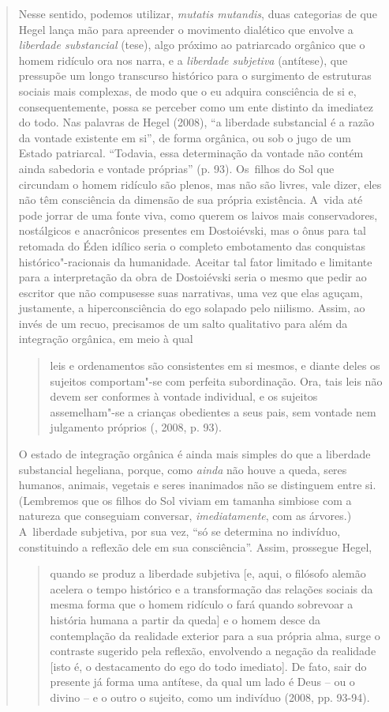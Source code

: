 {\begin{quote}
Nesse sentido, podemos utilizar, \emph{mutatis mutandis}, duas
categorias de que Hegel lança mão para apreender o movimento dialético
que envolve a \emph{liberdade substancial} (tese), algo próximo ao
patriarcado orgânico que o homem ridículo ora nos narra, e a
\emph{liberdade subjetiva} (antítese), que pressupõe um longo transcurso
histórico para o surgimento de estruturas sociais mais complexas, de
modo que o eu adquira consciência de si e, consequentemente, possa se
perceber como um ente distinto da imediatez do todo. Nas palavras de
Hegel (2008), ``a liberdade substancial é a razão da vontade existente
em si'', de forma orgânica, ou sob o jugo de um Estado patriarcal.
``Todavia, essa determinação da vontade não contém ainda sabedoria e
vontade próprias'' (p. 93). Os~filhos do Sol que circundam o homem
ridículo são plenos, mas não são livres, vale dizer, eles não têm
consciência da dimensão de sua própria existência. A~vida até pode
jorrar de uma fonte viva, como querem os laivos mais conservadores,
nostálgicos e anacrônicos presentes em Dostoiévski, mas o ônus para tal
retomada do Éden idílico seria o completo embotamento das conquistas
histórico"-racionais da humanidade. Aceitar tal fator limitado e
limitante para a interpretação da obra de Dostoiévski seria o mesmo que
pedir ao escritor que não compusesse suas narrativas, uma vez que elas
aguçam, justamente, a hiperconsciência do ego solapado pelo niilismo.
Assim, ao invés de um recuo, precisamos de um salto qualitativo para
além da integração orgânica, em meio à qual

\begin{quote}
leis e ordenamentos são consistentes em si mesmos, e diante deles os
sujeitos comportam"-se com perfeita subordinação. Ora, tais leis não
devem ser conformes à vontade individual, e os sujeitos assemelham"-se a
crianças obedientes a seus pais, sem vontade nem julgamento próprios
(, 2008, p. 93).
\end{quote}

O estado de integração orgânica é ainda mais simples do que a liberdade
substancial hegeliana, porque, como \emph{ainda} não houve a queda,
seres humanos, animais, vegetais e seres inanimados não se distinguem
entre si. (Lembremos que os filhos do Sol viviam em tamanha simbiose com
a natureza que conseguiam conversar, \emph{imediatamente}, com as
árvores.) A~liberdade subjetiva, por sua vez, ``só se determina no
indivíduo, constituindo a reflexão dele em sua consciência''. Assim,
prossegue Hegel,

\begin{quote}
quando se produz a liberdade subjetiva {[}e, aqui, o filósofo alemão
acelera o tempo histórico e a transformação das relações sociais da
mesma forma que o homem ridículo o fará quando sobrevoar a história
humana a partir da queda{]} e o homem desce da contemplação da realidade
exterior para a sua própria alma, surge o contraste sugerido pela
reflexão, envolvendo a negação da realidade {[}isto é, o destacamento do
ego do todo imediato{]}. De fato, sair do presente já forma uma
antítese, da qual um lado é Deus -- ou o divino -- e o outro o sujeito,
como um indivíduo (2008, pp. 93-94).
\end{quote}


\end{quote}}
